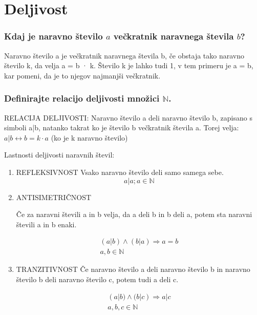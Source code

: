 \documentclass{article}
\begin{document}
\section{Deljivost}
\subsubsection*{Kdaj je naravno število $a$ večkratnik naravnega števila $b$?}
Naravno število a je večkratnik naravnega števila b, če obstaja tako naravno število k,
da velja a = b · k.
Število k je lahko tudi 1, v tem primeru je a = b, kar pomeni, da je to njegov najmanjši večkratnik.


\subsubsection*{Definirajte relacijo deljivosti množici $\mathbb{N}$.}

RELACIJA DELJIVOSTI: Naravno število a deli naravno število b, zapisano s simboli a|b, natanko takrat ko je število b večkratnik števila a.
Torej velja: $a | b \longleftrightarrow b = k \cdot a$ (ko je k naravno število)


Lastnosti deljivosti naravnih števil:
\begin{enumerate}
\item REFLEKSIVNOST
Vsako naravno število deli samo samega sebe.
\begin{equation*}
    a | a; a \in \mathbb{N}
\end{equation*}

\item ANTISIMETRIČNOST


Če za naravni števili a in b velja, da a deli b in b deli a, potem sta naravni števili a in b
enaki.

\begin{gather*}
    (a | b) \land (b | a) \Rightarrow a = b \\
    a, b \in \mathbb{N}
\end{gather*}

\item TRANZITIVNOST
Če naravno število a deli naravno število b in naravno število b deli naravno število c,
potem tudi a deli c.

\begin{gather*}
    (a | b) \land (b | c) \Rightarrow a | c \\
    a, b, c \in \mathbb{N}
\end{gather*}

\end{enumerate}
\end{document}
